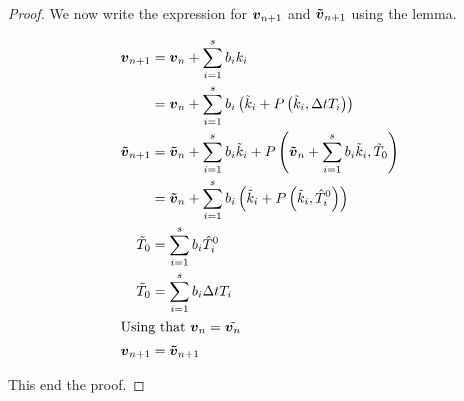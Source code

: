 \begin{proof}
We now write the expression for ${\boldsymbol {v}}_{n+1}$ and ${\boldsymbol {\tilde{v}}}_{n+1}$ using the lemma.

\begin{align*}
{\boldsymbol {v}}_{n+1}&={\boldsymbol {v}}_{n}+\sum_{i=1}^{s}b_{i}k_{i}\\
&={\boldsymbol {v}}_{n}+\sum_{i=1}^{s}b_{i}\left(\tilde{k}_{i}+P\left(\tilde{k}_{i},\Delta tT_{i}\right)\right)\\
{\boldsymbol {\tilde{v}}}_{n+1}&={\boldsymbol {\tilde{v}}}_{n}+\sum_{i=1}^{s}b_{i}\tilde{k}_{i}+P\left({\boldsymbol {\tilde{v}}}_{n}+\sum_{i=1}^{s}b_{i}\tilde{k}_{i},\tilde{T}_{0}\right)\\
&={\boldsymbol {\tilde{v}}}_{n}+\sum_{i=1}^{s}b_{i}\left(\tilde{k}_{i}+P\left(\tilde{k}_{i},\hat{T}_{i}^{0}\right)\right)\\
\tilde{T}_{0}&=\sum_{i=1}^{s}b_{i}\hat{T}_{i}^{0}\\
\tilde{T}_{0}&=\sum_{i=1}^{s}b_{i}\Delta t T_{i}\\
\intertext{Using that ${\boldsymbol {v}}_{n}=\tilde{{\boldsymbol {v}}_{n}}$}
{\boldsymbol {v}}_{n+1}&={\boldsymbol {\tilde{v}}}_{n+1}
\end{align*}

This end the proof.

\end{proof}

